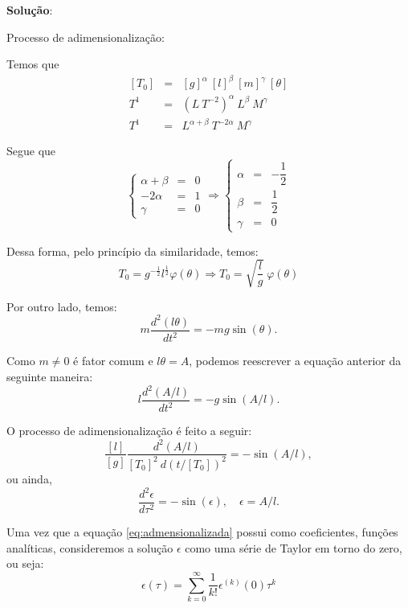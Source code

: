     \textbf{Solução}:
    {\color{orange}
    Processo de adimensionalização:
    
    Temos que
    \[\begin{array}{rcl}
    [T_0] &=& [g]^{\alpha}\ [l]^\beta\ [m]^\gamma\ [\theta] \\[0.2cm]
    T^{1} &=& (L\ T^{-2})^{\alpha}\ L^\beta\ M^\gamma \\[0.2cm]
    T^{1} &=& L^{\alpha+\beta}\ T^{-2\alpha}\ M^\gamma
    \end{array}\]
    
    Segue que
    \[
    \left\{\begin{array}{rcl} \alpha+\beta &=& 0 \\ -2\alpha &=& 1 \\ \gamma &=& 0 \end{array}\right.
    \Rightarrow
    \left\{\begin{array}{rcl} \alpha &=& -\dfrac{1}{2} \\[0.3cm] \beta &=& \dfrac{1}{2} \\[0.3cm] \gamma &=& 0  \end{array}\right.
    \]
    
    Dessa forma, pelo princípio da similaridade, temos:
    \begin{equation}\label{eq:Tps}
    T_0 = g^{-\frac{1}{2}} l^{\frac{1}{2}} \varphi(\theta) \Rightarrow T_0 = \sqrt{\dfrac{l}{g}}\ \varphi(\theta)
    \end{equation}
    
    
    Por outro lado, temos:
    \[m \dfrac{d^2(l\theta)}{dt^2} = - m g \sin(\theta).\]
    
    Como \(m \ne 0\) é fator comum  e \(l\theta = A\), podemos reescrever a equação anterior da seguinte maneira:
    \[l \dfrac{d^2(A/l)}{dt^2} = - g \sin(A/l).\]
    
    O processo de adimensionalização é feito a seguir:
    \[\dfrac{[l]}{[g]} \dfrac{d^2(A/l)}{[T_0]^2\ d(t/[T_0])^2} = -\sin(A/l),\]
    ou ainda,
    \begin{equation}\label{eq:admensionalizada}
    \dfrac{d^2\epsilon}{d\tau^2} = -\sin(\epsilon),\quad \epsilon = A/l.
    \end{equation}
    
    Uma vez que a equação \eqref{eq:admensionalizada} possui como coeficientes, funções analíticas, consideremos a solução \(\epsilon\) como uma série de Taylor em torno do zero, ou seja:
    \begin{equation}\label{eq:episilontaylor}
    \epsilon(\tau) = \displaystyle \sum_{k=0}^{\infty} \dfrac{1}{k!} \epsilon^{(k)}(0) \tau^k
    \end{equation}
    
}
